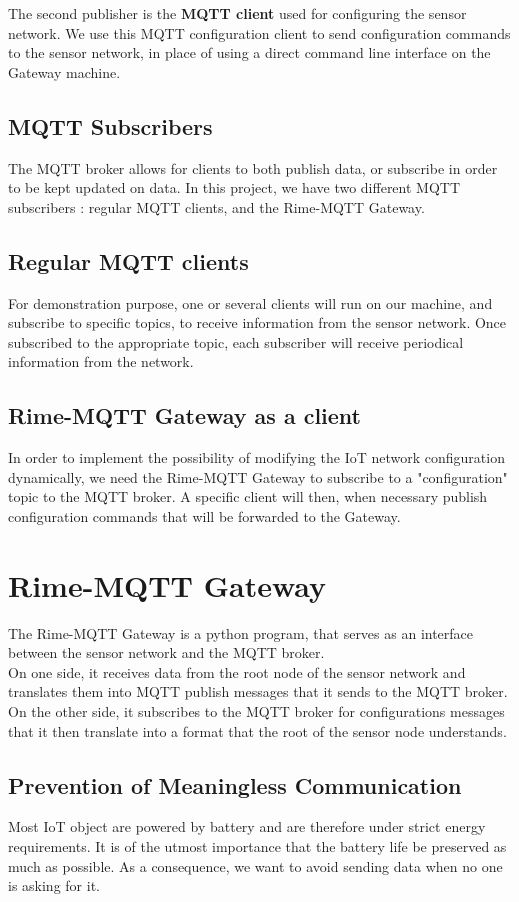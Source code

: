 \documentclass[a4paper,11pt]{article}
\begin{document}
The second publisher is the \textbf{MQTT client} used for configuring the sensor network. We use this MQTT configuration client to send configuration commands to the sensor network, in place of using a direct command line interface on the Gateway machine.

\subsection{MQTT Subscribers}
The MQTT broker allows for clients to both publish data, or subscribe in order to be kept updated on data. In this project, we have two different MQTT subscribers : regular MQTT clients, and the Rime-MQTT Gateway.

\subsection{Regular MQTT clients}
For demonstration purpose, one or several clients will run on our machine, and subscribe to specific topics, to receive information from the sensor network. Once subscribed to the appropriate topic, each subscriber will receive periodical information from the network.

\subsection{Rime-MQTT Gateway as a client}
In order to implement the possibility of modifying the IoT network configuration dynamically, we need the Rime-MQTT Gateway to subscribe to a "configuration" topic to the MQTT broker. A specific client will then, when necessary publish configuration commands that will be forwarded to the Gateway.


\section{Rime-MQTT Gateway}
The Rime-MQTT Gateway is a python program, that serves as an interface between the sensor network and the MQTT broker.\\

On one side, it receives data from the root node of the sensor network and translates them into MQTT publish messages that it sends to the MQTT broker. On the other side, it subscribes to the MQTT broker for configurations messages that it then translate into a format that the root of the sensor node understands.\\

\subsection{Prevention of Meaningless Communication}
Most IoT object are powered by battery and are therefore under strict energy requirements. It is of the utmost importance that the battery life be preserved as much as possible. As a consequence, we want to avoid sending data when no one is asking for it.\\
\end{document}
